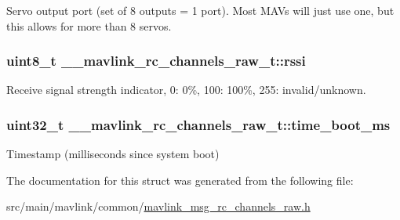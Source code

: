 Servo output port (set of 8 outputs = 1 port). Most M\+A\+Vs will just use one, but this allows for more than 8 servos. 

\hypertarget{struct____mavlink__rc__channels__raw__t_a23cda9263105190c2278e2bb1264a886}{
\subsubsection[{rssi}]{\setlength{\rightskip}{0pt plus 5cm}uint8\+\_\+t \+\_\+\+\_\+mavlink\+\_\+rc\+\_\+channels\+\_\+raw\+\_\+t\+::rssi}}\label{struct____mavlink__rc__channels__raw__t_a23cda9263105190c2278e2bb1264a886}


Receive signal strength indicator, 0\+: 0\%, 100\+: 100\%, 255\+: invalid/unknown. 

\hypertarget{struct____mavlink__rc__channels__raw__t_aceced8c76bb7171ce4f03c0b633f7a5f}{
\subsubsection[{time\+\_\+boot\+\_\+ms}]{\setlength{\rightskip}{0pt plus 5cm}uint32\+\_\+t \+\_\+\+\_\+mavlink\+\_\+rc\+\_\+channels\+\_\+raw\+\_\+t\+::time\+\_\+boot\+\_\+ms}}\label{struct____mavlink__rc__channels__raw__t_aceced8c76bb7171ce4f03c0b633f7a5f}


Timestamp (milliseconds since system boot) 



The documentation for this struct was generated from the following file\+:\begin{DoxyCompactItemize}
\item 
src/main/mavlink/common/\hyperlink{mavlink__msg__rc__channels__raw_8h}{mavlink\+\_\+msg\+\_\+rc\+\_\+channels\+\_\+raw.\+h}\end{DoxyCompactItemize}
